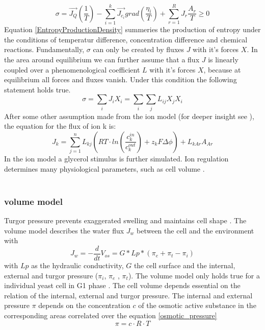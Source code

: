 \begin{equation}\label{EntropyProductionDensity}
	\sigma = \vec{J_Q}\left(\frac{1}{T}\right) - \sum_{i=1}^{k}\vec{J_{c_i}}grad \left(\frac{\eta _i}{T}\right) + \sum_{r=1}^{R}J_r \frac{A_r}{T} \geq 0
\end{equation}
Equation \ref{EntropyProductionDensity} summeries the production of entropy under the conditions of temperatur difference, concentration difference and chemical reactions.
Fundamentally, $\sigma$ can only be created by fluxes $J$ with it’s forces $X$. In the area around equilibrium we can further assume that a flux $J$ is linearly coupled over a phenomenological coefficient $L$ with it’s forces $X$, because at equilibrium all forces and fluxes vanish. Under this condition the following statement holds true.
\begin{equation}\label{stoeachimetricCoeff}
	\sigma = \sum_{i}J_i X_i =\sum_{i}\sum_{j}L_{ij}X_j X_i
\end{equation}
After some other assumption made from the ion model (for deeper insight see \cite{Gerber_2016}), the equation for the flux of ion k is:
\begin{equation*}
J_k = \sum_{j=1}^n L_{kj}(RT\cdot ln\left(\frac{c_k^{in}}{c_k^{out}}\right) + z_kF\Delta \phi ) + L_{kAr}A_{Ar}
\end{equation*}
In the ion model a glycerol stimulus is further simulated. Ion regulation determines many physiological parameters, such as cell volume \cite{Ke_2013}.\\\\
\subsubsection{volume model}
Turgor pressure prevents exaggerated swelling and maintains cell shape \cite{volumeModel}. The volume model \cite{volumeModel} describes the water flux $J_w$ between the cell and the environment with 
\begin{equation}\label{waterFlux}
	J_{w} = - \frac{d}{dt} V_{os} = G * Lp * (\pi_e + \pi_t - \pi_i)
\end{equation}
with $Lp$ as the hydraulic conductivity, $G$ the cell surface and the internal, external and turgor pressure  ($\pi_i$, $\pi_e$ , $\pi_t$). The volume model only holds true for a individual yeast cell in G1 phase \cite{volumeModel}.
The cell volume depends essential on the relation of the internal, external and turgor pressure. The internal and external pressure $\pi$ depends on the concentration $c$ of the osmotic active substance in the corresponding areas correlated over the equation \ref{osmotic_pressure}
\begin{equation} \label{osmotic_pressure}
	\pi = c \cdot R \cdot T	
\end{equation} 

